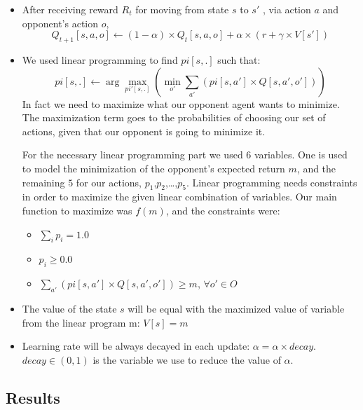 \documentclass[a4paper,11pt]{article}
\begin{document}
\begin{itemize}
\item After receiving reward $R_t$ for moving from state $s$ to $s'$ , via action $a$ and opponent's action $o$,
\[
Q_{t+1}[s,a,o] \leftarrow (1-\alpha)\times Q_t[s,a,o] + \alpha \times (r + \gamma \times V[s'])
\]

\item We used linear programming to find $pi[s,.]$ such that:
\[
pi[s,.] \leftarrow \arg\max_{pi'[s,.]} {(\min_{o'} \sum_{a'} (pi[s,a'] \times Q[s,a',o']))}
\]
In fact we need to maximize what our opponent agent wants to minimize. The maximization term goes to the probabilities of choosing our set of actions, given that our opponent is going to minimize it. 

For the necessary linear programming part we used $6$ variables. One is used to model the minimization of the opponent's expected return $m$, and the remaining $5$ for our actions, $p_1$,$p_2$,\ldots,$p_5$. Linear programming needs constraints in order to maximize the given linear combination of variables. Our main function to maximize was $f(m)$, and the constraints were:
\begin{itemize}
\item $ \sum_{i}{p_i} = 1.0$
\item $ p_i \geq 0.0$
\item $ \sum_{a'} (pi[s,a'] \times Q[s,a',o']) \geq m$, $\forall o' \in O$
\end{itemize}
\item The value of the state $s$ will be equal with the maximized value of variable from the linear program m: $V[s] = m$
\item Learning rate will be always decayed in each update: $\alpha = \alpha \times decay$. $decay \in (0,1)$ is the variable we use to reduce the value of $\alpha$.
\end{itemize}


\subsection{Results}
\end{document}

